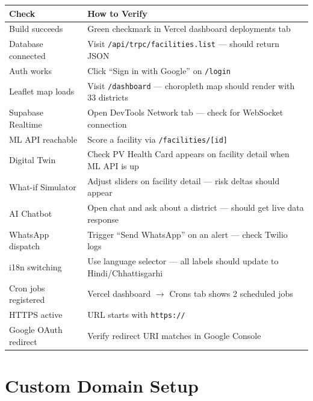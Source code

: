 \documentclass[12pt,a4paper]{report}
\begin{document}
\begin{tabularx}{\textwidth}{lX}
\toprule
\textbf{Check} & \textbf{How to Verify} \\
\midrule
Build succeeds          & Green checkmark in Vercel dashboard deployments tab \\
Database connected      & Visit \texttt{/api/trpc/facilities.list} --- should return JSON \\
Auth works              & Click ``Sign in with Google'' on \texttt{/login} \\
Leaflet map loads       & Visit \texttt{/dashboard} --- choropleth map should render with 33 districts \\
Supabase Realtime       & Open DevTools Network tab --- check for WebSocket connection \\
ML API reachable        & Score a facility via \texttt{/facilities/[id]} \\
Digital Twin            & Check PV Health Card appears on facility detail when ML API is up \\
What-if Simulator       & Adjust sliders on facility detail --- risk deltas should appear \\
AI Chatbot              & Open chat and ask about a district --- should get live data response \\
WhatsApp dispatch       & Trigger ``Send WhatsApp'' on an alert --- check Twilio logs \\
i18n switching           & Use language selector --- all labels should update to Hindi/Chhattisgarhi \\
Cron jobs registered    & Vercel dashboard $\rightarrow$ Crons tab shows 2 scheduled jobs \\
HTTPS active            & URL starts with \texttt{https://} \\
Google OAuth redirect   & Verify redirect URI matches in Google Console \\
\bottomrule
\end{tabularx}

\section{Custom Domain Setup}
\end{document}
